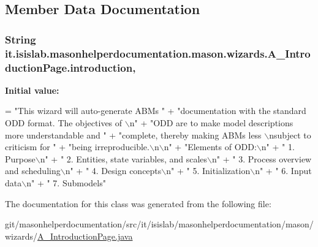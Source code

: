 \subsection{Member Data Documentation}
\hypertarget{classit_1_1isislab_1_1masonhelperdocumentation_1_1mason_1_1wizards_1_1_a___introduction_page_a48f9e6bddf3bb2d7ba3995b09dd4da0b}{
\subsubsection[{introduction}]{\setlength{\rightskip}{0pt plus 5cm}String it.\-isislab.\-masonhelperdocumentation.\-mason.\-wizards.\-A\-\_\-\-Introduction\-Page.\-introduction\hspace{0.3cm}{\ttfamily [static]}, {\ttfamily [private]}}}\label{classit_1_1isislab_1_1masonhelperdocumentation_1_1mason_1_1wizards_1_1_a___introduction_page_a48f9e6bddf3bb2d7ba3995b09dd4da0b}
{\bfseries Initial value\-:}
\begin{DoxyCode}
= \textcolor{stringliteral}{"This wizard will auto-generate ABMs "}
                            + \textcolor{stringliteral}{"documentation with the standard ODD format. The objectives of \(\backslash\)n"}
                            + \textcolor{stringliteral}{"ODD are to make model descriptions more understandable and "}
                            + \textcolor{stringliteral}{"complete, thereby making ABMs less \(\backslash\)nsubject to criticism for "}
                            + \textcolor{stringliteral}{"being irreproducible.\(\backslash\)n\(\backslash\)n"}
                            + \textcolor{stringliteral}{"Elements of ODD:\(\backslash\)n"}
                            + \textcolor{stringliteral}{"   1. Purpose\(\backslash\)n"}
                            + \textcolor{stringliteral}{"   2. Entities, state variables, and scales\(\backslash\)n"}
                            + \textcolor{stringliteral}{"   3. Process overview and scheduling\(\backslash\)n"}
                            + \textcolor{stringliteral}{"   4. Design concepts\(\backslash\)n"}
                            + \textcolor{stringliteral}{"   5. Initialization\(\backslash\)n"}  
                            + \textcolor{stringliteral}{"   6. Input data\(\backslash\)n"}
                            + \textcolor{stringliteral}{"   7. Submodels"}
\end{DoxyCode}


The documentation for this class was generated from the following file\-:\begin{DoxyCompactItemize}
\item 
git/masonhelperdocumentation/src/it/isislab/masonhelperdocumentation/mason/wizards/\hyperlink{_a___introduction_page_8java}{A\-\_\-\-Introduction\-Page.\-java}\end{DoxyCompactItemize}
